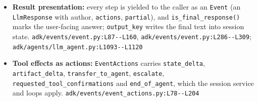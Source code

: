\begin{itemize}
\item \textbf{Result presentation:} every step is yielded to the caller as an \texttt{Event} (an \texttt{LlmResponse} with author, \texttt{actions}, \texttt{partial}), and \texttt{is\_\allowbreak{}final\_\allowbreak{}response(\allowbreak{})} marks the user-facing answer; \texttt{output\_\allowbreak{}key} writes the final text into session state. \texttt{adk/\allowbreak{}events/\allowbreak{}event.\allowbreak{}py:\allowbreak{}L87-\allowbreak{}-\allowbreak{}L160}, \texttt{adk/\allowbreak{}events/\allowbreak{}event.\allowbreak{}py:\allowbreak{}L286-\allowbreak{}-\allowbreak{}L309}; \texttt{adk/\allowbreak{}agents/\allowbreak{}llm\_\allowbreak{}agent.\allowbreak{}py:\allowbreak{}L1093-\allowbreak{}-\allowbreak{}L1120}
\item \textbf{Tool effects as actions:} \texttt{EventActions} carries \texttt{state\_\allowbreak{}delta}, \texttt{artifact\_\allowbreak{}delta}, \texttt{transfer\_\allowbreak{}to\_\allowbreak{}agent}, \texttt{escalate}, \texttt{requested\_\allowbreak{}tool\_\allowbreak{}confirmations} and \texttt{end\_\allowbreak{}of\_\allowbreak{}agent}, which the session service and loops apply. \texttt{adk/\allowbreak{}events/\allowbreak{}event\_\allowbreak{}actions.\allowbreak{}py:\allowbreak{}L78-\allowbreak{}-\allowbreak{}L204}
\end{itemize}

